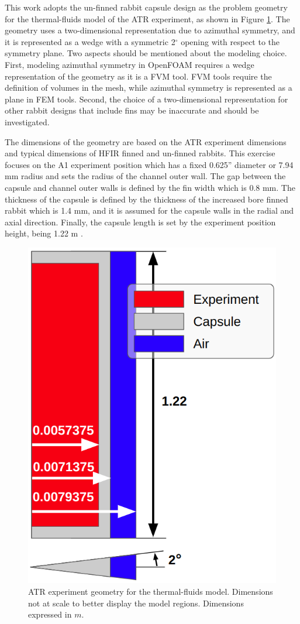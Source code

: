 This work adopts the un-finned rabbit capsule design as the problem geometry for the thermal-fluids model of the ATR experiment, as shown in Figure \ref{fig:atr-geo}.
The geometry uses a two-dimensional representation due to azimuthal symmetry, and it is represented as a wedge with a symmetric 2$^\circ$ opening with respect to the symmetry plane.
Two aspects should be mentioned about the modeling choice.
First, modeling azimuthal symmetry in OpenFOAM requires a wedge representation of the geometry as it is a \gls*{FVM} tool.
\gls*{FVM} tools require the definition of volumes in the mesh, while azimuthal symmetry is represented as a plane in \gls*{FEM} tools. 
Second, the choice of a two-dimensional representation for other rabbit designs that include fins may be inaccurate and should be investigated.

The dimensions of the geometry are based on the ATR experiment dimensions and typical dimensions of HFIR finned and un-finned rabbits.
This exercise focuses on the A1 experiment position which has a fixed 0.625'' diameter or 7.94 mm radius and sets the radius of the channel outer wall.
The gap between the capsule and channel outer walls is defined by the fin width which is 0.8 mm.
The thickness of the capsule is defined by the thickness of the increased bore finned rabbit which is 1.4 mm, and it is assumed for the capsule walls in the radial and axial direction.
Finally, the capsule length is set by the experiment position height, being 1.22 m \cite{inl_advanced_2009}.



\begin{figure}[htbp!] %
    \centering
    \includegraphics[width=0.40\linewidth]{figures/atr-geometry}
    \hfill
    \caption{ATR experiment geometry for the thermal-fluids model. Dimensions not at scale to better display the model regions. Dimensions expressed in $m$.}
    \label{fig:atr-geo}
\end{figure}

